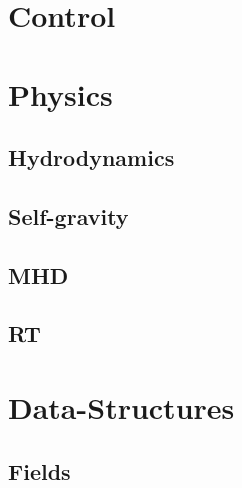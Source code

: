 \documentclass{book}
\begin{document}
\section{Control}

\section{Physics}

\subsection{Hydrodynamics}

\subsection{Self-gravity}

\subsection{MHD}

\subsection{RT}

\section{Data-Structures}

\subsection{Fields}

\end{document}
